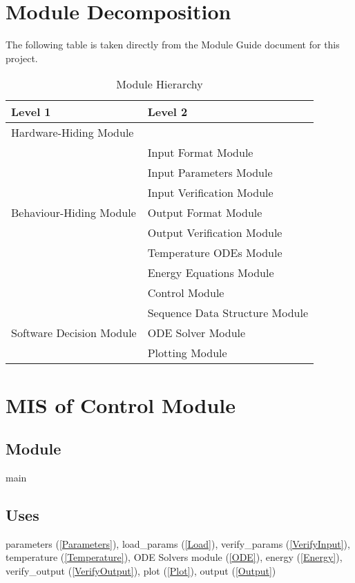 \documentclass[12pt]{article}
\begin{document}
\section{Module Decomposition}
The following table is taken directly from the Module Guide document for this project.
\begin{table}[!h]
	\centering
	\begin{tabular}{p{} p{}}
		\toprule
		\textbf{Level 1} & \textbf{Level 2}\\
		\midrule
		
		{Hardware-Hiding Module} & ~ \\
		\midrule
		
		\multirow{7}{0.3\textwidth}{Behaviour-Hiding Module} & Input Format Module\\
		& Input Parameters Module\\
		& Input Verification Module\\
		& Output Format Module\\
		& Output Verification Module\\
		& Temperature ODEs Module\\
		& Energy Equations Module\\ 
		& Control Module\\
		\midrule
		
		\multirow{3}{0.3\textwidth}{Software Decision Module} & {Sequence Data Structure Module}\\
		& ODE Solver Module\\
		& Plotting Module\\
		\bottomrule
		
	\end{tabular}
	\caption{Module Hierarchy}
	\label{TblMH}
\end{table}

\section{MIS of Control Module} \label{Main}
\subsection{Module}
main
\subsection{Uses}
parameters (\ref{Parameters}), load\_params (\ref{Load}), verify\_params (\ref{VerifyInput}), temperature (\ref{Temperature}), ODE Solvers module (\ref{ODE}), energy (\ref{Energy}), verify\_output (\ref{VerifyOutput}), plot (\ref{Plot}), output (\ref{Output})
\end{document}
